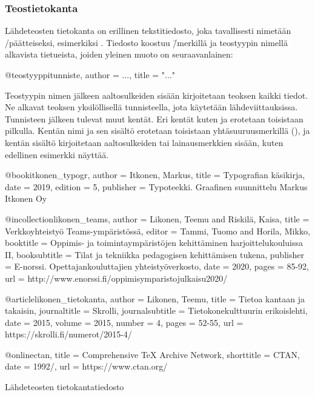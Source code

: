 \subsubsection{Teostietokanta}

Lähdeteosten tietokanta on erillinen tekstitiedosto, joka tavallisesti
nimetään \-/päätteiseksi, esimerkiksi .
Tiedosto koostuu \=/merkillä ja teostyypin nimellä alkavista
tietueista, joiden yleinen muoto on seuraavanlainen:

\begin{koodilohkosis}
@teostyyppi{tunniste,
  author = {...},
  title = "..."
}
\end{koodilohkosis}

\noindent
Teostyypin nimen jälkeen aaltosulkeiden sisään kirjoitetaan teoksen
kaikki tiedot. Ne alkavat teoksen yksilöllisellä tunnisteella, jota
käytetään lähdeviittauksissa. Tunnisteen jälkeen tulevat muut kentät.
Eri kentät kuten  ja  erotetaan toisistaan
pilkulla. Kentän nimi ja sen sisältö erotetaan toisistaan
yhtäsuuruusmerkillä (\koodi{=}), ja kentän sisältö kirjoitetaan
aaltosulkeiden tai lainausmerkkien sisään, kuten edellinen esimerkki
näyttää.

\begin{esimerkki*}
\begin{koodilohko}
@book{itkonen_typogr,
  author = {Itkonen, Markus},
  title = {Typografian käsikirja},
  date = {2019},
  edition = {5},
  publisher = {Typoteekki. Graafinen suunnittelu Markus Itkonen Oy}
}

@incollection{likonen_teams,
  author = {Likonen, Teemu and Riskilä, Kaisa},
  title = {Verkkoyhteistyö Teams-ympäristössä},
  editor = {Tammi, Tuomo and Horila, Mikko},
  booktitle = {Oppimis- ja toimintaympäristöjen kehittäminen
    harjoittelukouluissa II},
  booksubtitle = {Tilat ja tekniikka pedagogisen kehittämisen tukena},
  publisher = {E-norssi. Opettajankouluttajien yhteistyöverkosto},
  date = {2020},
  pages = {85-92},
  url = {http://www.enorssi.fi/oppimisymparistojulkaisu2020/}
}

@article{likonen_tietokanta,
  author = {Likonen, Teemu},
  title = {Tietoa kantaan ja takaisin},
  journaltitle = {Skrolli},
  journalsubtitle = {Tietokonekulttuurin erikoislehti},
  date = {2015},
  volume = {2015},
  number = {4},
  pages = {52-55},
  url = {https://skrolli.fi/numerot/2015-4/}
}

@online{ctan,
  title = {Comprehensive TeX Archive Network},
  shorttitle = {CTAN},
  date = {1992/},
  url = {https://www.ctan.org/}
}
\end{koodilohko}
  \caption{Lähdeteosten tietokantatiedosto}
  \label{esim/bib-tiedosto}
\end{esimerkki*}

